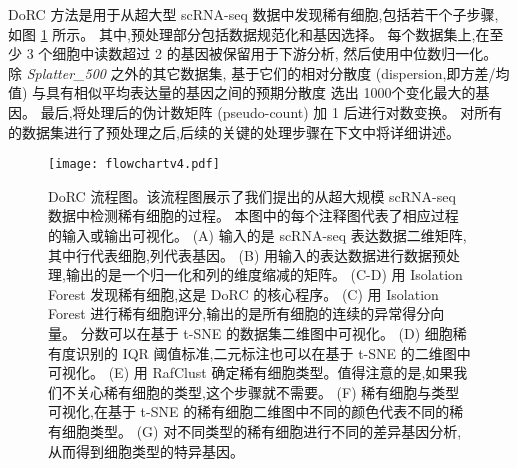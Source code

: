 DoRC 方法是用于从超大型 scRNA-seq 数据中发现稀有细胞,包括若干个子步骤,如图 \ref{fig:flowchart} 所示。
其中,预处理部分包括数据规范化和基因选择。
每个数据集上,在至少 3 个细胞中读数超过 2 的基因被保留用于下游分析,
然后使用中位数归一化。
除 \textit{Splatter\_500} 之外的其它数据集,
基于它们的相对分散度 (dispersion,即方差/均值) 与具有相似平均表达量的基因之间的预期分散度 选出 1000个变化最大的基因。
最后,将处理后的伪计数矩阵 (pseudo-count) 加 1 后进行对数变换。
对所有的数据集进行了预处理之后,后续的关键的处理步骤在下文中将详细讲述。

\begin{figure}[!htbp]
    \centering
    \texttt{[image: flowchartv4.pdf]}
    \caption{DoRC 流程图。该流程图展示了我们提出的从超大规模 scRNA-seq 数据中检测稀有细胞的过程。
    本图中的每个注释图代表了相应过程的输入或输出可视化。
    (A) 输入的是 scRNA-seq 表达数据二维矩阵,其中行代表细胞,列代表基因。
    (B) 用输入的表达数据进行数据预处理,输出的是一个归一化和列的维度缩减的矩阵。
    (C-D) 用 Isolation Forest 发现稀有细胞,这是 DoRC 的核心程序。
    (C) 用 Isolation Forest 进行稀有细胞评分,输出的是所有细胞的连续的异常得分向量。
    分数可以在基于 t-SNE 的数据集二维图中可视化。
    (D) 细胞稀有度识别的 IQR 阈值标准,二元标注也可以在基于 t-SNE 的二维图中可视化。
    (E) 用 RafClust 确定稀有细胞类型。值得注意的是,如果我们不关心稀有细胞的类型,这个步骤就不需要。
    (F) 稀有细胞与类型可视化,在基于 t-SNE 的稀有细胞二维图中不同的颜色代表不同的稀有细胞类型。
    (G) 对不同类型的稀有细胞进行不同的差异基因分析,从而得到细胞类型的特异基因。
    }
    \label{fig:flowchart}
\end{figure}

